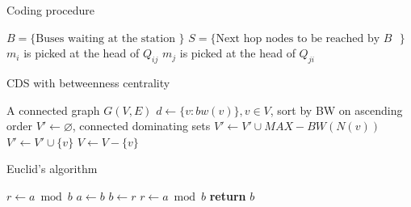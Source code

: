 \documentclass{article}
\let\emptyset\varnothing
\begin{document}
\begin{algorithm}
	\begin{algorithmic}%
		\caption{Coding procedure} \label{algorithm:encoding}
		\STATE $B=\{\text{Buses waiting at the station } \}$
		\STATE $S=\{\text{Next hop nodes to be reached by $B$ }\}$
				\IF{$Q_{ij} \neq \emptyset \text{ and } Q_{ji} \neq \emptyset$}
					\STATE $m_i$ is picked at the head of $Q_{ij}$
					\STATE $m_j$ is picked at the head of $Q_{ji}$
				\ENDIF
			\ENDFOR
		\ENDFOR				
	\end{algorithmic}
\end{algorithm}

\begin{algorithm}
	\begin{algorithmic}%
		\caption{CDS with betweenness centrality} \label{algorithm: cds bw}
		\REQUIRE A connected graph $G(V, E)$
		\STATE $d \gets \{v : bw(v)\}, v \in V$, sort by BW on ascending order
		\STATE $V' \gets \emptyset$, connected dominating sets
        	    \STATE $V' \gets V' \cup MAX-BW(N(v))$		
        	\ELSE
        	    \STATE $V' \gets V' \cup \{v\}$
        	\ENDIF
        	\STATE $V \gets V-\{v\}$
		\ENDFOR				
	\end{algorithmic}
\end{algorithm}

\begin{algorithm}
    \caption{Euclid’s algorithm}
    \label{euclid}
    \begin{algorithmic}[1] %
            \STATE $r\gets a \bmod b$
                \STATE $a \gets b$
                \STATE $b \gets r$
                \STATE $r \gets a \bmod b$
            \ENDWHILE\label{euclidendwhile}
            \STATE \textbf{return} $b$			%
    \end{algorithmic}
\end{algorithm}
\end{document}
